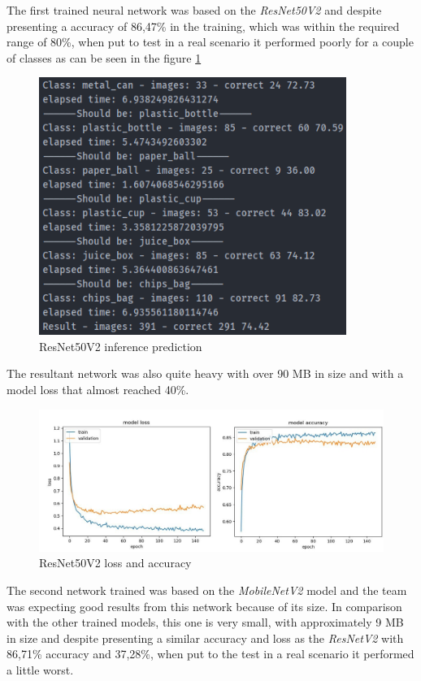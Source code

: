 \documentclass[a4paper,11pt]{article}
\begin{document}
The first trained neural network was based on the \textit{ResNet50V2} and despite presenting a accuracy of 86,47\% in the training, which was within the required range of 80\%, when put to test in a real scenario it performed poorly for a couple of classes as can be seen in the figure \ref{fig:resnet}

\begin{figure}[H]
  \centering
  \includegraphics[width=10cm]{Figures/ResNet50V2-E150-6C-0-PRED.png}
  \caption{\small{ResNet50V2 inference prediction}}
  \label{fig:resnet}
\end{figure}

The resultant network was also quite heavy with over 90 MB in size and with a model loss that almost reached 40\%.

\begin{figure}[H]
  \centering
  \includegraphics[width=12cm]{Figures/ResNet50V2_Loss_Acc.jpg}
  \caption{\small{ResNet50V2 loss and accuracy}}
  \label{fig:resnetLossAcc}
\end{figure}

The second network trained was based on the \textit{MobileNetV2} model and the team was expecting good results from this network because of its size. In comparison with the other trained models, this one is very small, with approximately 9 MB in size and despite presenting a similar accuracy and loss as the \textit{ResNetV2} with 86,71\% accuracy and 37,28\%, when put to the test in a real scenario it performed a little worst.
\end{document}
